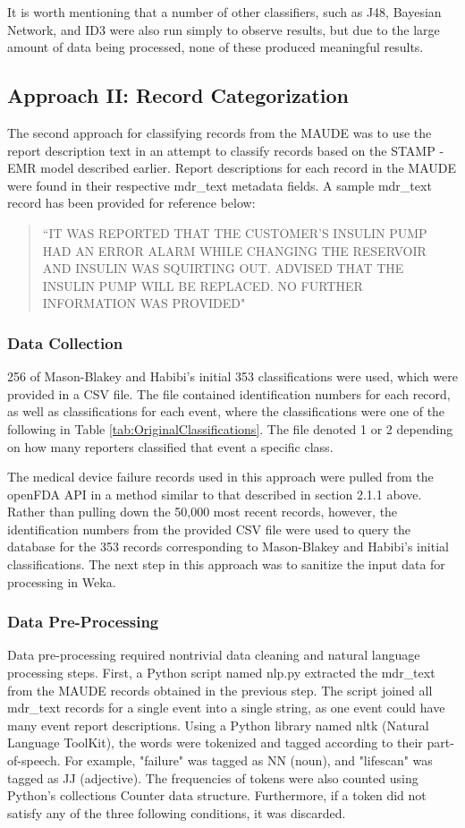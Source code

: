 \documentclass[11pt, notitlepage,abstracton,oneside]{article}   	%
\begin{document}
It is worth mentioning that a number of other classifiers, such as J48, Bayesian Network, and ID3 were also run simply to observe results, but due to the large amount of data being processed, none of these produced meaningful results. 

\subsection{Approach II: Record Categorization}
The second approach for classifying records from the MAUDE was to use the report description text in an attempt to classify records based on the STAMP - EMR model described earlier. Report descriptions for each record in the MAUDE were found in their respective mdr\_text metadata fields. A sample mdr\_text record has been provided for reference below:

\begin{quote}
``IT WAS REPORTED THAT THE CUSTOMER'S INSULIN PUMP HAD AN ERROR ALARM WHILE CHANGING THE RESERVOIR AND INSULIN WAS SQUIRTING OUT. ADVISED THAT THE INSULIN PUMP WILL BE REPLACED. NO FURTHER INFORMATION WAS PROVIDED"
\end{quote} 

\subsubsection{Data Collection}
256 of Mason-Blakey and Habibi's initial 353 classifications were used, which were provided in a CSV file. The file contained identification numbers for each record, as well as classifications for each event, where the classifications were one of the following in Table \ref{tab:OriginalClassifications}. The file denoted 1 or 2 depending on how many reporters classified that event a specific class.

The medical device failure records used in this approach were pulled from the openFDA API in a method similar to that described in section 2.1.1 above. Rather than pulling down the 50,000 most recent records, however, the identification numbers from the provided CSV file were used to query the database for the 353 records corresponding to Mason-Blakey and Habibi's initial classifications. The next step in this approach was to sanitize the input data for processing in Weka.

\subsubsection{Data Pre-Processing}
Data pre-processing required nontrivial data cleaning and natural language processing steps. First, a Python script named nlp.py extracted the mdr\_text from the MAUDE records obtained in the previous step. The script joined all mdr\_text records for a single event into a single string, as one event could have many event report descriptions. Using a Python library named nltk (Natural Language ToolKit), the words were tokenized and tagged according to their part-of-speech. For example, "failure" was tagged as NN (noun), and "lifescan" was tagged as JJ (adjective). The frequencies of tokens were also counted using Python's collections Counter data structure. Furthermore, if a token did not satisfy any of the three following conditions, it was discarded.
\end{document}
